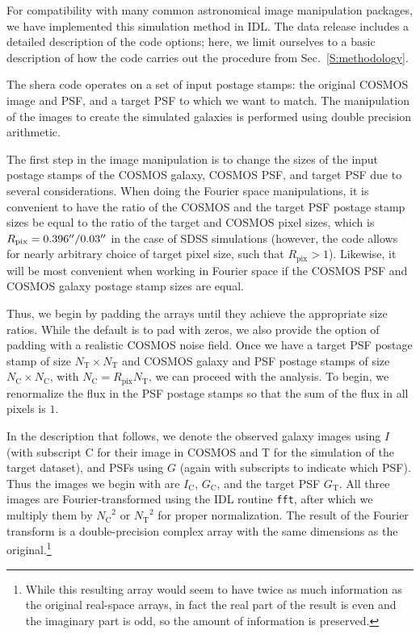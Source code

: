 \documentclass[twocolumn,useAMS,usenatbib]{mn2e}
\newcommand{\ic}{\ensuremath{I_\mathrm{C}}}
\newcommand{\pc}{\ensuremath{G_\mathrm{C}}}
\newcommand{\ps}{\ensuremath{G_\mathrm{T}}}
\newcommand{\rpix}{\ensuremath{R_\mathrm{pix}}}
\newcommand{\nc}{\ensuremath{N_\mathrm{C}}}
\newcommand{\nt}{\ensuremath{N_\mathrm{T}}}
\begin{document}
For compatibility with many common astronomical image manipulation
packages, we have implemented this simulation method in IDL.  The data
release includes a detailed description of the code options; here, we
limit ourselves to a basic description of how the code carries out the
procedure from Sec.~\ref{S:methodology}.

The {\sc shera} code operates on a set of input postage stamps: the
original COSMOS image and PSF, and a target PSF to which we want to
match.  The manipulation of the images to create the simulated
galaxies is performed using double precision arithmetic.

The first step in the image manipulation is to change the sizes of the
input postage stamps of the COSMOS galaxy, COSMOS PSF, and target PSF
due to several considerations.  When doing the
Fourier space manipulations, it is convenient to have the ratio of the
COSMOS and the target PSF postage stamp sizes be equal to the ratio of
the target and COSMOS pixel sizes, which is
$ \rpix = 0.396\arcsec/0.03\arcsec$ in the case of SDSS
simulations (however, the code allows for nearly arbitrary choice of
target pixel size, such that $\rpix>1$).  Likewise, it will be most convenient when working
in Fourier space if the COSMOS PSF and COSMOS galaxy postage stamp
sizes are equal.

Thus, we begin by padding the arrays until they achieve the
appropriate size ratios.  While the default is to pad with zeros, we
also provide the option of padding with a realistic COSMOS noise
field.  
Once we have a target PSF postage stamp of size $\nt\times \nt$
and COSMOS galaxy and PSF postage stamps of size $\nc\times \nc$, with
$\nc=\rpix \nt$, we can proceed with the analysis.  To begin, we
renormalize the flux in the PSF postage stamps so that the sum of the
flux in all pixels is $1$.

In the description that follows, we denote the observed galaxy images
using $I$ (with subscript C for their image in COSMOS and T for the
simulation of the target dataset), and PSFs using $G$ (again with subscripts to
indicate which PSF).  Thus the images we begin with are \ic, \pc, and
the target PSF \ps.  All three images are Fourier-transformed  using the IDL routine {\tt fft}, after which we
multiply them by $\nc^2$ or $\nt^2$ for proper normalization.  The
result of the Fourier transform is a double-precision complex array
with the same dimensions as the original.\footnote{While this
  resulting array would seem to have twice as much information as the
  original real-space arrays, in fact the real part of the result is
  even and the imaginary part is odd, so the amount of information is
  preserved.}  %
\end{document}
